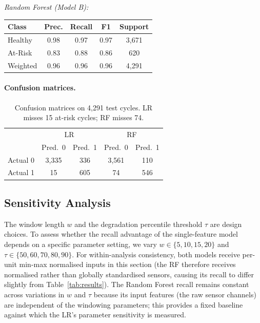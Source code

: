 \documentclass[10pt,twocolumn]{article}
\begin{document}
\noindent\textit{Random Forest (Model B):}
\begin{center}\small
\begin{tabular}{lcccc}
\toprule
Class & Prec. & Recall & F1 & Support\\
\midrule
Healthy  & 0.98 & 0.97 & 0.97 & 3,671\\
At-Risk  & 0.83 & 0.88 & 0.86 & 620\\
\midrule
Weighted & 0.96 & 0.96 & 0.96 & 4,291\\
\bottomrule
\end{tabular}
\end{center}

\paragraph{Confusion matrices.}

\begin{table}[h]
\centering
\caption{Confusion matrices on 4,291 test cycles.
LR misses 15 at-risk cycles; RF misses 74.}
\label{tab:cm}
\vspace{4pt}
\small
\begin{tabular}{lcc|cc}
\toprule
 & \multicolumn{2}{c|}{LR} & \multicolumn{2}{c}{RF} \\
 & Pred.\ 0 & Pred.\ 1 & Pred.\ 0 & Pred.\ 1 \\
\midrule
Actual 0 & 3{,}335 & 336 & 3{,}561 & 110 \\
Actual 1 & 15 & 605 & 74 & 546 \\
\bottomrule
\end{tabular}
\end{table}

\subsection{Sensitivity Analysis}
\label{sec:sensitivity}

The window length $w$ and the degradation percentile threshold $\tau$ are design
choices.
To assess whether the recall advantage of the single-feature model depends on a
specific parameter setting, we vary $w \in \{5,10,15,20\}$ and
$\tau \in \{50,60,70,80,90\}$.
For within-analysis consistency, both models receive per-unit min-max normalised
inputs in this section (the RF therefore receives normalised rather than globally
standardised sensors, causing its recall to differ slightly from
Table~\ref{tab:results}).
The Random Forest recall remains constant across variations in $w$ and $\tau$ because
its input features (the raw sensor channels) are independent of the windowing
parameters; this provides a fixed baseline against which the LR's parameter sensitivity
is measured.
\end{document}
